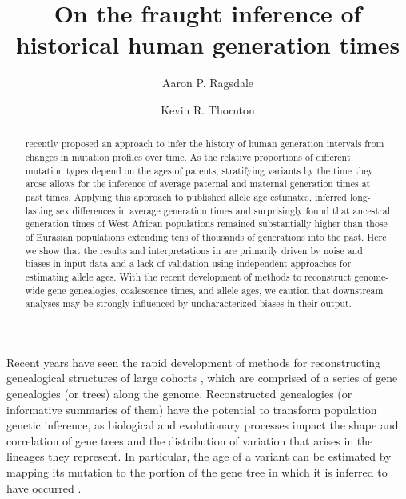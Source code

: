 \documentclass[]{article}
\begin{document}
\title{On the fraught inference of historical human generation times}
\author[1,*]{Aaron P. Ragsdale}
\author[2]{Kevin R. Thornton}
\maketitle

\begin{abstract}

    \noindent \citet{wang2023human} recently proposed an approach to infer the
    history of human generation intervals from changes in mutation profiles
    over time. As the relative proportions of different mutation types depend
    on the ages of parents, stratifying variants by the time they arose allows
    for the inference of average paternal and maternal generation times at past
    times. Applying this approach to published allele age estimates,
    \citet{wang2023human} inferred long-lasting sex differences in average
    generation times and surprisingly found that ancestral generation times of
    West African populations remained substantially higher than those of
    Eurasian populations extending tens of thousands of generations into the
    past. Here we show that the results and interpretations in
    \citet{wang2023human} are primarily driven by noise and biases in input
    data and a lack of validation using independent approaches for estimating
    allele ages. With the recent development of methods to reconstruct
    genome-wide gene genealogies, coalescence times, and allele ages, we
    caution that downstream analyses may be strongly influenced by
    uncharacterized biases in their output.

\end{abstract}

Recent years have seen the rapid development of methods for reconstructing
genealogical structures of large cohorts
\citep{speidel2019method,wohns2022unified,hubisz2020mapping}, which are
comprised of a series of gene genealogies (or trees) along the genome.
Reconstructed genealogies (or informative summaries of them) have the potential
to transform population genetic inference, as biological and evolutionary
processes impact the shape and correlation of gene trees and the distribution
of variation that arises in the lineages they represent. In particular, the age
of a variant can be estimated by mapping its mutation to the portion of the
gene tree in which it is inferred to have occurred \citep{albers2020dating}.
\end{document}
